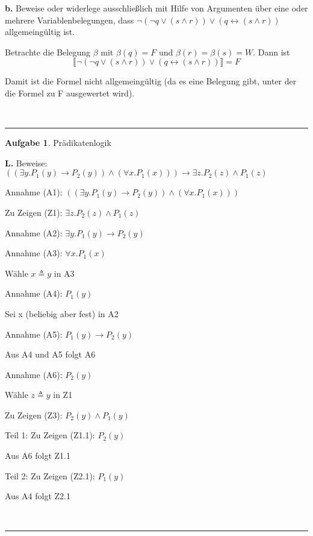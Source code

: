 \documentclass[10pt,leqno ]{article}
\theoremstyle{definition}
\newtheorem{problem}[theorem]{Aufgabe}
\newenvironment{solution}[1][L]{\begin{doublespace}\textbf{#1.}\quad }{\ \rule{0.5em}{0.5em}\end{doublespace}}
\begin{document}
\begin{solution}[b]
Beweise oder widerlege ausschließlich mit Hilfe von Argumenten über eine oder mehrere Variablenbelegungen, dass \( \lnot (\lnot q \lor (s \land r)) \lor (q \leftrightarrow (s \land r)) \) allgemeingültig ist.

Betrachte die Belegung \( \beta \) mit \( \beta (q) = F \) und \( \beta (r) = \beta (s) = W \). Dann ist
\[ \llbracket \lnot (\lnot q \lor (s \land r)) \lor (q \leftrightarrow (s \land r)) \rrbracket = F \]

Damit ist die Formel nicht allgemeingültig (da es eine Belegung gibt, unter der die Formel zu F ausgewertet wird).

\end{solution}
    
\begin{problem}
    Prädikatenlogik
\end{problem}

\begin{solution}
Beweise: \( ((\exists y . P_1(y) \rightarrow P_2(y)) \land (\forall x . P_1(x))) \rightarrow \exists z . P_2(z) \land P_1(z) \)

Annahme (A1): \( ((\exists y . P_1(y) \rightarrow P_2(y)) \land (\forall x . P_1(x))) \)

Zu Zeigen (Z1): \( \exists z . P_2(z) \land P_1(z) \)

Annahme (A2): \( \exists y . P_1(y) \rightarrow P_2(y) \)

Annahme (A3): \( \forall x . P_1(x) \)

Wähle \(  x \triangleq y \) in A3

Annahme (A4): \( P_1(y) \)

Sei x (beliebig aber fest) in A2

Annahme (A5): \( P_1(y) \rightarrow P_2(y) \)

Aus A4 und A5 folgt A6

Annahme (A6): \( P_2(y) \)

Wähle \( z \triangleq y \) in Z1

Zu Zeigen (Z3): \( P_2(y) \land P_1(y) \)

Teil 1: Zu Zeigen (Z1.1): \( P_2(y) \)

\qquad Aus A6 folgt Z1.1

Teil 2: Zu Zeigen (Z2.1): \( P_1(y) \)

\qquad Aus A4 folgt Z2.1

\end{solution}
\end{document}
